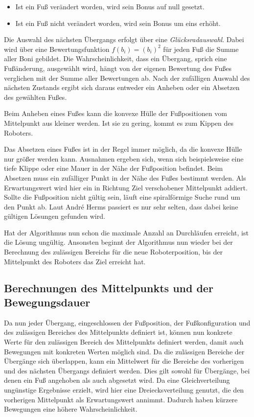 \begin{itemize}
  \item Ist ein Fuß verändert worden, wird sein Bonus auf null gesetzt.
  \item Ist ein Fuß nicht verändert worden, wird sein Bonus um eins erhöht.
\end{itemize}

Die Auswahl des nächsten Übergangs erfolgt über eine \emph{Glücksradauswahl}. Dabei wird über eine Bewertungsfunktion $f(b_i) = (b_i)^2$ für jeden Fuß die Summe aller Boni gebildet. Die Wahrscheinlichkeit, dass ein Übergang, sprich eine Fußänderung, ausgewählt wird, hängt von der eigenen Bewertung des Fußes verglichen mit der Summe aller Bewertungen ab. Nach der zufälligen Auswahl des nächsten Zustands ergibt sich daraus entweder ein Anheben oder ein Absetzen des gewählten Fußes.

Beim Anheben eines Fußes kann die konvexe Hülle der Fußpositionen vom Mittelpunkt aus kleiner werden. Ist sie zu gering, kommt es zum Kippen des Roboters.

Das Absetzen eines Fußes ist in der Regel immer möglich, da die konvexe Hülle nur größer werden kann. Ausnahmen ergeben sich, wenn sich beispielsweise eine tiefe Klippe oder eine Mauer in der Nähe der Fußposition befindet. Beim Absetzen muss ein zufälliger Punkt in der Nähe des Fußes bestimmt werden. Als Erwartungswert wird hier ein in Richtung Ziel verschobener Mittelpunkt addiert. Sollte die Fußposition nicht gültig sein, läuft eine spiralförmige Suche rund um den Punkt ab. Laut André Herms passiert es nur sehr selten, dass dabei keine gültigen Lösungen gefunden wird.

Hat der Algorithmus nun schon die maximale Anzahl an Durchläufen erreicht, ist die Lösung ungültig. Ansonsten beginnt der Algorithmus nun wieder bei der Berechnung des zulässigen Bereichs für die neue Roboterposition, bis der Mittelpunkt des Roboters das Ziel erreicht hat.

\subsection{Berechnungen des Mittelpunkts und der Bewegungsdauer}

Da nun jeder Übergang, eingeschlossen der Fußposition, der Fußkonfiguration und des zulässigen Bereiches des Mittelpunkts definiert ist, können nun konkrete Werte für den zulässigen Bereich des Mittelpunkts definiert werden, damit auch Bewegungen mit konkreten Werten möglich sind. Da die zulässigen Bereiche der Übergänge sich überlappen, kann ein Mittelwert für die Bereiche des vorherigen und des nächsten Übergangs definiert werden. Dies gilt sowohl für Übergänge, bei denen ein Fuß angehoben als auch abgesetzt wird. Da eine Gleichverteilung ungünstige Ergebnisse erzielt, wird hier eine Dreiecksverteilung genutzt, die den vorherigen Mittelpunkt als Erwartungswert annimmt. Dadurch haben kürzere Bewegungen eine höhere Wahrscheinlichkeit.  

